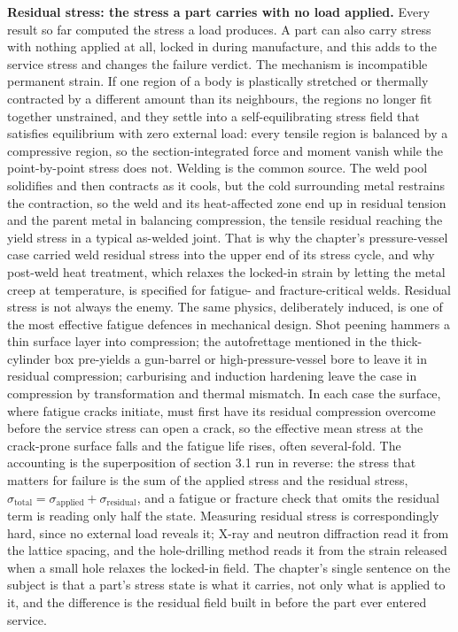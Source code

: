 \begin{mastery}
\textbf{Residual stress: the stress a part carries with no load applied.}
Every result so far computed the stress a load produces. A part can also
carry stress with nothing applied at all, locked in during manufacture,
and this  adds to the service stress and changes
the failure verdict. The mechanism is incompatible permanent strain. If
one region of a body is plastically stretched or thermally contracted by
a different amount than its neighbours, the regions no longer fit together
unstrained, and they settle into a self-equilibrating stress field that
satisfies equilibrium with zero external load: every tensile region is
balanced by a compressive region, so the section-integrated force and
moment vanish while the point-by-point stress does not. Welding is the
common source. The weld pool solidifies and then contracts as it cools,
but the cold surrounding metal restrains the contraction, so the weld and
its heat-affected zone end up in residual tension and the parent metal in
balancing compression, the tensile residual reaching the yield stress in
a typical as-welded joint. That is why the chapter's pressure-vessel case
carried weld residual stress into the upper end of its stress cycle, and
why post-weld heat treatment, which relaxes the locked-in strain by
letting the metal creep at temperature, is specified for fatigue- and
fracture-critical welds. Residual stress is not always the enemy. The
same physics, deliberately induced, is one of the most effective fatigue
defences in mechanical design. Shot peening hammers a thin surface layer
into compression; the autofrettage mentioned in the thick-cylinder box
pre-yields a gun-barrel or high-pressure-vessel bore to leave it in
residual compression; carburising and induction hardening leave the case
in compression by transformation and thermal mismatch. In each case the
surface, where fatigue cracks initiate, must first have its residual
compression overcome before the service stress can open a crack, so the
effective mean stress at the crack-prone surface falls and the fatigue
life rises, often several-fold. The accounting is the superposition of
section 3.1 run in reverse: the stress that matters for failure is the
sum of the applied stress and the residual stress, $\sigma_{\text{total}}
= \sigma_{\text{applied}} + \sigma_{\text{residual}}$, and a fatigue or
fracture check that omits the residual term is reading only half the
state. Measuring residual stress is correspondingly hard, since no
external load reveals it; X-ray and neutron diffraction read it from the
lattice spacing, and the hole-drilling method reads it from the strain
released when a small hole relaxes the locked-in field. The chapter's
single sentence on the subject is that a part's stress state is what it
carries, not only what is applied to it, and the difference is the
residual field built in before the part ever entered service.
\end{mastery}


